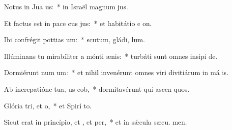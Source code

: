 \item Notus in Jua us:~* in Israël magnum  jus.
\item Et factus est in pace cus jus:~* et habitátio e  on.
\item Ibi confrégit pottias um:~* scutum, gládi,  lum.
\item Illúminans tu mirabíliter a mónti ænis:~* turbáti sunt omnes insipi de.
\item Dormiérunt num um:~* et nihil invenérunt omnes viri divitiárum in má is.
\item Ab increpatióne tua, us cob,~* dormitavérunt qui ascen quos.
\item Glória tri, et o,~* et Spirí to.
\item Sicut erat in princípio, et , et per,~* et in sǽcula sæcu. men.
